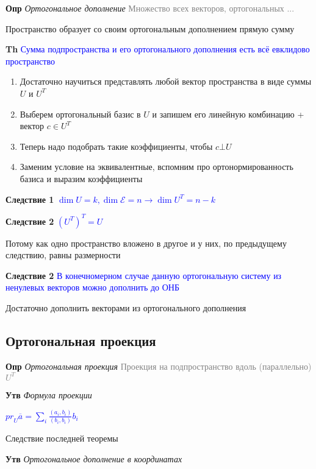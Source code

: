 \documentclass[a4paper, 14pt]{article}
\begin{document}
    \textbf{Опр} \textit{Ортогональное дополнение} \textcolor{gray}{Множество всех векторов, ортогональных ...}
    
    Пространство образует со своим ортогональным дополнением прямую сумму
    
    \textbf{Th} \textcolor{blue}{Сумма подпространства и его ортогонального дополнения есть всё евклидово пространство}
    
    \begin{enumerate}
        \item Достаточно научиться представлять любой вектор пространства в виде суммы $U$ и $U^T$
        \item Выберем ортогональный базис в $U$ и запишем его линейную комбинацию + вектор $c \in  U^T$
        \item Теперь надо подобрать такие коэффициенты, чтобы $c \bot U$
        \item Заменим условие на эквивалентные, вспомним про ортонормированность базиса и выразим коэффициенты
    \end{enumerate}
    
    \textbf{Следствие 1} \textcolor{blue}{$\dim U = k, \dim \mathscr{E} = n \rightarrow \dim U^T = n - k$}
    
    \textbf{Следствие 2} \textcolor{blue}{$(U^T)^T = U$}
    
    Потому как одно пространство вложено в другое и у них, по предыдущему следствию, равны размерности
    
    \textbf{Следствие 2} \textcolor{blue}{В конечномерном случае данную ортогональную систему из ненулевых векторов
    можно дополнить до ОНБ}
    
    Достаточно дополнить векторами из ортогонального дополнения
    
    \subsection{Ортогональная проекция}
    
    \textbf{Опр} \textit{Ортогональная проекция} \textcolor{gray}{Проекция на подпространство вдоль (параллельно) $U^T$}
    
    \textbf{Утв} \textit{Формула проекции}
    
    \textcolor{blue}{${pr}_U \overline{a} = \sum_i \frac{(a_i, b_i)}{(b_i, b_i)} b_i$}
    
    Следствие последней теоремы
    
    \textbf{Утв} \textit{Ортогональное дополнение в координатах}
    
\end{document}
